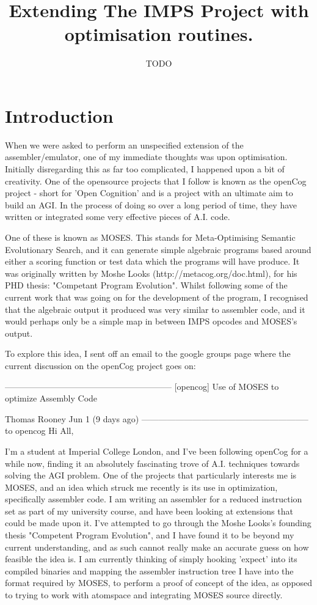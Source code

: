 \documentclass[11pt]{article}
\begin{document}
\title{Extending The IMPS Project with optimisation routines. }
\author{TODO}

\maketitle

\section{Introduction}

When we were asked to perform an unspecified extension of the assembler/emulator, one of my immediate thoughts was upon optimisation. Initially disregarding this as far too complicated, I happened upon a bit of creativity. One of the opensource projects that I follow is known as the openCog project - short for 'Open Cognition' and is a project with an ultimate aim to build an AGI. In the process of doing so over a long period of time, they have written or integrated some very effective pieces of A.I. code. 

One of these is known as MOSES. This stands for Meta-Optimising Semantic Evolutionary Search, and it can generate simple algebraic programs based around either a scoring function or test data which the programs will have produce. It was originally written by Moshe Looks (http://metacog.org/doc.html), for his PHD thesis: "Competant Program Evolution". Whilst following some of the current work that was going on for the development of the program, I recognised that the algebraic output it produced was very similar to assembler code, and it would perhaps only be a simple map in between IMPS opcodes and MOSES's output. 

To explore this idea, I sent off an email to the google groups page where the current discussion on the openCog project goes on:

-----------------------------------------------------------
[opencog] Use of MOSES to optimize Assembly Code

Thomas Rooney
Jun 1 (9 days ago)
-----------------------------------------------------------
to opencog 
Hi All,

I'm a student at Imperial College London, and I've been following
openCog for a while now, finding it an absolutely fascinating trove of A.I. techniques towards solving the AGI problem. One of the projects that particularly interests me is MOSES, and an idea which struck me recently is its use in optimization, specifically assembler code. 
I am writing an assembler for a reduced instruction set as part of my university course, and have been looking at extensions that could be made upon it. I've attempted to go through the Moshe Looks's founding thesis "Competent Program Evolution", and I have found it to be beyond my current understanding, and as such cannot really make an accurate guess on how feasible the idea is. I am currently thinking of simply hooking 'expect' into its compiled binaries and mapping the assembler instruction tree I have into the format required by MOSES, to perform a proof of concept of the idea, as opposed to trying to work with atomspace and integrating MOSES source directly.
\end{document}
